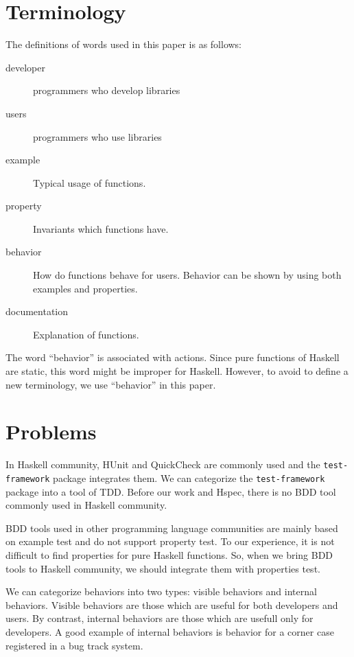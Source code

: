 \documentclass[preprint]{sigplanconf}
\newcommand{\hspec}{Hspec}
\begin{document}
\section{Terminology}

The definitions of words used in this paper is as follows:

\begin{description}
\item[developer] programmers who develop libraries
\item[users] programmers who use libraries
\item[example] Typical usage of functions.
\item[property] Invariants which functions have.
\item[behavior] How do functions behave for users. Behavior can be shown by using both examples and properties.
\item[documentation] Explanation of functions.
\end{description}

The word ``behavior'' is associated with actions.
Since pure functions of Haskell are static,
this word might be improper for Haskell.
However, to avoid to define a new terminology,
we use ``behavior'' in this paper.

\section{Problems}

In Haskell community, HUnit and QuickCheck are commonly used %
and the {\tt test-framework} package integrates them.
We can categorize the {\tt test-framework} package into
a tool of TDD.
Before our work and \hspec{}, there is no BDD tool commonly used in Haskell community.

BDD tools used in other programming language communities are
mainly based on example test
and do not support property test.
To our experience, it is not difficult to find properties for
pure Haskell functions.
So, when we bring BDD tools to
Haskell community, we should integrate them with properties test.

We can categorize behaviors into two types: visible behaviors
and internal behaviors.
Visible behaviors are those which are useful for both developers and users.
By contrast, internal behaviors are those which are usefull only for developers.
A good example of internal behaviors
is behavior for a corner case registered in a bug track system.
\end{document}
